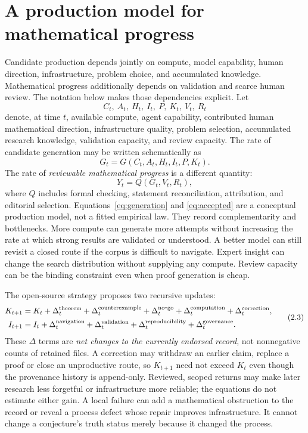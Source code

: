 \documentclass[10pt]{article}
\begin{document}
\section{A production model for mathematical progress}\label{sec:model}

Candidate production depends jointly on compute, model capability, human
direction, infrastructure, problem choice, and accumulated knowledge.
Mathematical progress additionally depends on validation and scarce human
review.  The notation below makes those dependencies explicit.  Let
\[
 C_t,\ A_t,\ H_t,\ I_t,\ P,\ K_t,\ V_t,\ R_t
\]
denote, at time $t$, available compute, agent capability, contributed human
mathematical direction, infrastructure quality, problem selection, accumulated
research knowledge, validation capacity, and review capacity.  The rate of
candidate generation may be written schematically as
\[
 G_t=G(C_t,A_t,H_t,I_t,P,K_t).
\tag{2.1}\label{eq:generation}
\]
The rate of \emph{reviewable mathematical progress} is a different quantity:
\[
 Y_t=Q(G_t,V_t,R_t),
\tag{2.2}\label{eq:accepted}
\]
where $Q$ includes formal checking, statement reconciliation, attribution,
and editorial selection.  Equations~\eqref{eq:generation} and
\eqref{eq:accepted} are a conceptual production model, not a fitted empirical
law.  They record complementarity and bottlenecks.  More compute can generate
more attempts without increasing the rate at which strong results are
validated or understood.  A better model can still revisit a closed route if
the corpus is difficult to navigate.  Expert insight can change the search
distribution without supplying any compute.  Review capacity can be the
binding constraint even when proof generation is cheap.

The open-source strategy proposes two recursive updates:
\[
 \begin{aligned}
 K_{t+1}&=K_t+\Delta_t^{\rm theorem}
              +\Delta_t^{\rm counterexample}
              +\Delta_t^{\rm no\mbox{-}go}
              +\Delta_t^{\rm computation}
              +\Delta_t^{\rm correction},\\
 I_{t+1}&=I_t+\Delta_t^{\rm navigation}
              +\Delta_t^{\rm validation}
              +\Delta_t^{\rm reproducibility}
              +\Delta_t^{\rm governance}.
 \end{aligned}
\tag{2.3}\label{eq:feedback}
\]
These $\Delta$ terms are \emph{net changes to the currently endorsed record},
not nonnegative counts of retained files. A correction may withdraw an earlier
claim, replace a proof or close an unproductive route, so $K_{t+1}$ need not
exceed $K_t$ even though the provenance history is append-only. Reviewed,
scoped returns may make later research less forgetful or infrastructure more
reliable; the equations do not estimate either gain. A local failure can add
a mathematical obstruction to the record or reveal a process defect whose
repair improves infrastructure. It cannot change a conjecture's truth status
merely because it changed the process.
\end{document}

